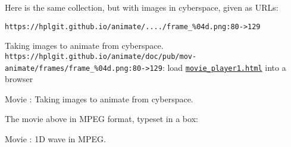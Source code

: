 \documentclass[%
oneside,                 %
final,                   %
10pt]{article}
\newenvironment{doconce:movie}{}{}
\newcounter{doconce:movie:counter}
\begin{document}
Here is the same collection, but with images in cyberspace, given as URLs:

\begin{Verbatim}[numbers=none,fontsize=\fontsize{9pt}{9pt},baselinestretch=0.95]
https://hplgit.github.io/animate/..../frame_%04d.png:80->129
\end{Verbatim}


\begin{doconce:movie}
\begin{center}
Taking images to animate from cyberspace. \Verb!https://hplgit.github.io/animate/doc/pub/mov-animate/frames/frame_%
\end{center}

\begin{center}  %
Movie : Taking images to animate from cyberspace.
\end{center}
\end{doconce:movie}


The movie above in MPEG format, typeset in a box:


\begin{center}
\begin{Sbox}
\begin{minipage}{0.85\linewidth}

\begin{doconce:movie}
\begin{center}

\end{center}

\begin{center}  %
Movie : 1D wave in MPEG. \label{mov:wave}
\end{center}
\end{doconce:movie}
\end{minipage}
\end{Sbox}
\fbox{\TheSbox}
\end{center}
\end{document}
